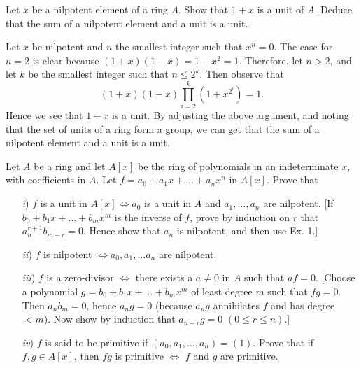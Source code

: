 \documentclass[10pt]{amsart}
\begin{document}

\begin{exercise}
    Let $x$ be a nilpotent element of a ring $A$. Show that $1 + x$ is a unit of $A$. Deduce that the sum of a nilpotent element and a unit is a unit.
\end{exercise}

\begin{solution}
    Let $x$ be nilpotent and $n$ the smallest integer such that $x^n = 0$. The case for $n = 2$ is clear 
    because $(1 + x)(1 - x) = 1 - x^2 = 1$. Therefore, let $n > 2$, and let $k$ be the smallest integer 
    such that $n \le 2^k$. Then observe that 
    \[
        (1 + x)(1 - x) \prod_{i = 2}^{k}\left(1 + x^{2^i}\right) = 1.
    \]
    Hence we see that $1 + x$ is a unit. By adjusting the above argument, and noting that the 
    set of units of a ring form a group, we can get that the sum of a nilpotent element and a 
    unit is a unit. 
\end{solution}


\begin{exercise}
    Let $A$ be a ring and let $A[x]$ be the ring of polynomials in an indeterminate $x$, with coefficients in $A$. Let $f = a_0 + a_1x + \dots + a_nx^n$ in $A[x]$. 
    Prove that
    \begin{itemize}
        \item[\emph{i})] $f$ is a unit in $A[x] \iff a_0$ is a unit in $A$ and $a_1, \dots, a_n$ are nilpotent. [If $b_0 + b_1x +\dots+ b_mx^m$ 
        is the inverse of $f$, prove by induction on $r$ that $a_n^{r+1}b_{m-r} = 0$. Hence show that $a_n$ is nilpotent, and then use Ex. 1.]
        \item[\emph{ii})] $f$ is nilpotent $\iff a_0, a_1, \dots a_n$ are nilpotent.
        \item[\emph{iii})] $f$ is a zero-divisor $\iff$ there exists a $a \ne 0$ in $A$ such that $af = 0.$ [Choose a
        polynomial $g = b_0 +b_1x + \dots + b_mx^m$ of least degree $m$ such that $fg = 0$. Then $a_nb_m = 0$, hence $a_ng = 0$ 
        (because $a_n g$ annihilates $f
        $ and has degree $<m$). Now show by induction that $a_{n-r} g = 0$ $(0 \le r \le n)$.]
        \item[\emph{iv})] $f$ is said to be primitive if $(a_0, a_1, \dots , a_n) = (1)$. Prove that if $f,g \in A[x]$, then
        $fg$ is primitive $\iff$ $f$ and $g$ are primitive.
    \end{itemize}
\end{exercise}
\end{document}

